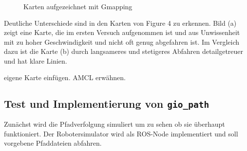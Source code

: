 \documentclass[11pt,a4paper]{article}
\begin{document}
{{	\begin{figure}[h]
		\centering
		\caption{Karten aufgezeichnet mit Gmapping}
	\end{figure}
	
	
	Deutliche Unterschiede sind in den Karten von Figure 4 zu erkennen. Bild (a) zeigt eine Karte, die im ersten Versuch aufgenommen ist und aus Unwissenheit mit zu hoher Geschwindigkeit und nicht oft genug abgefahren ist. Im Vergleich dazu ist die Karte (b) durch langsameres und stetigeres Abfahren detailgetreuer und hat klare Linien.
	
	
	eigene Karte einfügen. AMCL erwähnen.	
}




\subsection{Test und Implementierung von \texttt{gio\_path}}

Zun\"achst wird die Pfadverfolgung simuliert um zu sehen ob sie überhaupt funktioniert. Der Robotersimulator wird als ROS-Node implementiert und soll vorgebene Pfaddateien abfahren.

\begin{figure}[h]
	

\end{figure}}
\end{document}
